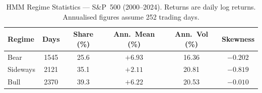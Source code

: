 \begin{table}[t]
\centering
\small
\setlength{\tabcolsep}{10pt}
\renewcommand{\arraystretch}{1.1}
\caption{HMM Regime Statistics --- S\&P~500 (2000--2024). Returns are daily log returns. Annualised figures assume 252 trading days.}
\label{tab:regime_stats}
\begin{tabular}{lccccc}
\toprule
Regime & Days & Share (\%) & Ann.\ Mean (\%) & Ann.\ Vol (\%) & Skewness \\
\midrule
Bear      & 1545 & 25.6 & $+6.93$ & 16.36 & $-0.202$ \\
Sideways  & 2121 & 35.1 & $+2.11$ & 20.81 & $-0.819$ \\
Bull      & 2370 & 39.3 & $+6.22$ & 20.53 & $-0.010$ \\
\bottomrule
\end{tabular}
\end{table}